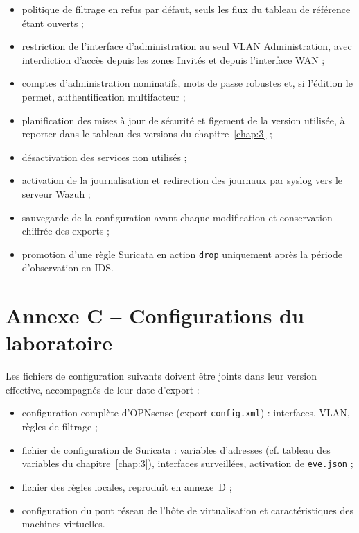 \begin{itemize}
\item politique de filtrage en refus par défaut, seuls les flux du tableau de référence étant ouverts ;
\item restriction de l'interface d'administration au seul VLAN Administration, avec interdiction d'accès depuis les zones Invités et depuis l'interface WAN ;
\item comptes d'administration nominatifs, mots de passe robustes et, si l'édition le permet, authentification multifacteur ;
\item planification des mises à jour de sécurité et figement de la version utilisée, à reporter dans le tableau des versions du chapitre~\ref{chap:3} ;
\item désactivation des services non utilisés ;
\item activation de la journalisation et redirection des journaux par syslog vers le serveur Wazuh ;
\item sauvegarde de la configuration avant chaque modification et conservation chiffrée des exports ;
\item promotion d'une règle Suricata en action \texttt{drop} uniquement après la période d'observation en IDS.
\end{itemize}


\section*{Annexe C -- Configurations du laboratoire}

Les fichiers de configuration suivants doivent être joints dans leur version effective, accompagnés de leur date d'export :

\begin{itemize}
\item configuration complète d'OPNsense (export \texttt{config.xml}) : interfaces, VLAN, règles de filtrage ;
\item fichier de configuration de Suricata : variables d'adresses (cf. tableau des variables du chapitre~\ref{chap:3}), interfaces surveillées, activation de \texttt{eve.json} ;
\item fichier des règles locales, reproduit en annexe~D ;
\item configuration du pont réseau de l'hôte de virtualisation et caractéristiques des machines virtuelles.
\end{itemize}


